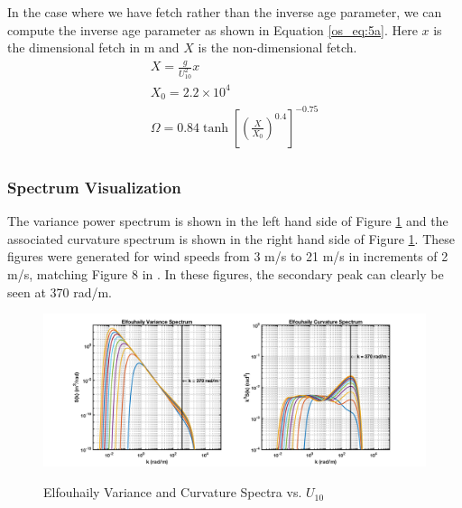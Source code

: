 In the case where we have fetch rather than the inverse age parameter, we can compute the inverse age parameter as shown in Equation \ref{os_eq:5a}. Here $x$ is the dimensional fetch in m and $X$ is the non-dimensional fetch.
\begin{equation}
\label{os_eq:5a}
\begin{gathered}
 X = \frac{g}{U_{10}^2}x\\
 X_0 = 2.2 \times 10^4 \\
 \Omega = 0.84\tanh\left[\left(\frac{X}{X_0} \right)^{0.4} \right]^{-0.75} \\
\end{gathered}
\end{equation}
\renewcommand{\baselinestretch}{2} \small\normalsize

\subsubsection{Spectrum Visualization}
The variance power spectrum is shown in the left hand side of Figure \ref{os_fig:3} and the associated curvature spectrum is shown in the right hand side of Figure \ref{os_fig:3}. These figures were generated for wind speeds from 3 m/s to 21 m/s in increments of 2 m/s, matching Figure 8 in \cite{elfouhaily}. In these figures, the secondary peak can clearly be seen at 370 rad/m.
\begin{figure}[H]
  \begin{center}
\includegraphics[width=6in]{../media/Ocean_Surface/elf_variance_curvature_spectrum.png}
  \end{center}
  \renewcommand{\baselinestretch}{1} \small\normalsize
  \begin{quote}
    \caption[Elfouhaily Variance and Curvature Spectra vs. $U_{10}$]{Elfouhaily Variance and Curvature Spectra vs. $U_{10}$\label{os_fig:3}}
  \end{quote}
\end{figure}
\renewcommand{\baselinestretch}{2} \small\normalsize

